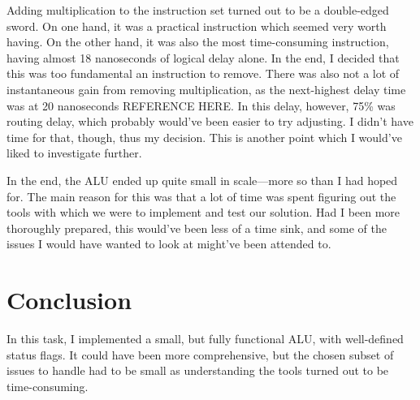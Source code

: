 \documentclass{article}
\begin{document}
Adding multiplication to the instruction set turned out to be a double-edged sword. On one hand, it was a practical instruction which seemed very worth having. On the other hand, it was also the most time-consuming instruction, having almost 18 nanoseconds of logical delay alone. In the end, I decided that this was too fundamental an instruction to remove. There was also not a lot of instantaneous gain from removing multiplication, as the next-highest delay time was at 20 nanoseconds REFERENCE HERE. In this delay, however, 75\% was routing delay, which probably would've been easier to try adjusting. I didn't have time for that, though, thus my decision. This is another point which I would've liked to investigate further. 

In the end, the ALU ended up quite small in scale---more so than I had hoped for. The main reason for this was that a lot of time was spent figuring out the tools with which we were to implement and test our solution. Had I been more thoroughly prepared, this would've been less of a time sink, and some of the issues I would have wanted to look at might've been attended to.
\section{Conclusion}
\label{sec:conclusion}
In this task, I implemented a small, but fully functional ALU, with well-defined status flags. It could have been more comprehensive, but the chosen subset of issues to handle had to be small as understanding the tools turned out to be time-consuming. 
\end{document}

